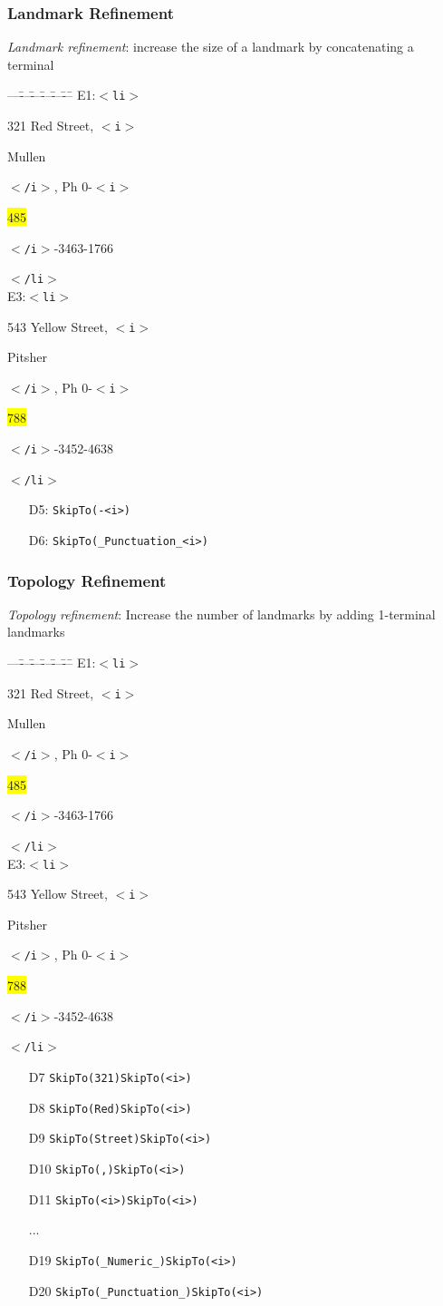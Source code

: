 \documentclass[svgnames]{beamer}
\newcounter{curtagcolor}
\newcommand{\xbtag}[1]{\textcolor{tagcolor!![\thecurtagcolor]}{$<$\texttt{#1}$>$}}
\newcommand{\xetag}[1]{\textcolor{tagcolor!![\thecurtagcolor]}{$<$\texttt{/#1}$>$}}
\newcommand{\xctag}[2]{\xbtag{#1}\addtocounter{curtagcolor}{1}#2\addtocounter{curtagcolor}{-1}\xetag{#1}}
\newenvironment{xml}{
  \begin{minipage}{.6\textwidth}
    \begin{tabbing}
      ---\=---\=---\=---\=---\=---\=\kill}{   
    \end{tabbing}
  \end{minipage}
}
\begin{document}

\begin{frame} \frametitle{Landmark Refinement}
  
  \emph{Landmark refinement}: increase the size of a landmark by concatenating
  a terminal

  \begin{exampleblock}{}
    \centering \scriptsize
    \begin{xml}
      E1:\xctag{li}{321 Red Street, \xctag{i}{Mullen}, Ph
        0-\xctag{i}{\colorbox{yellow}{485}}-3463-1766} \\
      E3:\xctag{li}{543 Yellow Street, \xctag{i}{Pitsher}, Ph
        0-\xctag{i}{\colorbox{yellow}{788}}-3452-4638}
    \end{xml}
  \end{exampleblock}

  \begin{itemize}
  \item[D5:] \texttt{SkipTo(-<i>)}
  \item[D6:] \texttt{SkipTo(\_Punctuation\_<i>)}
  \end{itemize}

\end{frame}


\begin{frame} \frametitle{Topology Refinement}

  \emph{Topology refinement}: Increase the number of landmarks by adding
  1-terminal landmarks

  \begin{exampleblock}{}
    \centering \scriptsize
    \begin{xml}
      E1:\xctag{li}{321 Red Street, \xctag{i}{Mullen}, Ph
        0-\xctag{i}{\colorbox{yellow}{485}}-3463-1766} \\
      E3:\xctag{li}{543 Yellow Street, \xctag{i}{Pitsher}, Ph
        0-\xctag{i}{\colorbox{yellow}{788}}-3452-4638}
    \end{xml}
  \end{exampleblock}

  \begin{itemize}
    \small
  \item[D7] \texttt{SkipTo(321)SkipTo(<i>)}
  \item[D8] \texttt{SkipTo(Red)SkipTo(<i>)}
  \item[D9] \texttt{SkipTo(Street)SkipTo(<i>)}
  \item[D10] \texttt{SkipTo(,)SkipTo(<i>)}
  \item[D11] \texttt{SkipTo(<i>)SkipTo(<i>)}
  \item[...]
  \item[D19] \texttt{SkipTo(\_Numeric\_)SkipTo(<i>)}
  \item[D20] \texttt{SkipTo(\_Punctuation\_)SkipTo(<i>)}
  \end{itemize}

\end{frame}
\end{document}
